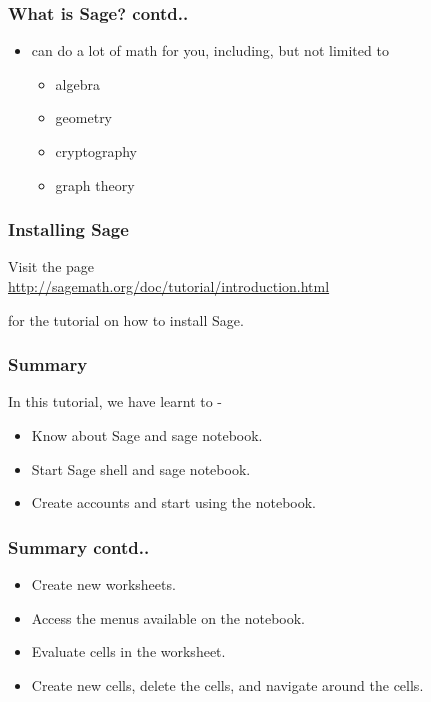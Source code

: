 \documentclass[17pt,compress]{beamer}
\begin{document}
\begin{frame}
\frametitle{What is Sage? contd..}
\label{sec-3.2}

\begin{itemize}
\item can do a lot of math for you, including, but not limited to\pause
	\begin{itemize}
	\item algebra
	\item geometry
	\item cryptography
	\item graph theory
	\end{itemize}\pause
\end{itemize}
\end{frame}
\begin{frame}
\frametitle{Installing Sage}
\label{sec-4}

   Visit the page\\
\vspace{8pt}   
   \url{http://sagemath.org/doc/tutorial/introduction.html}\\\pause
\vspace{5pt}   
  
   for the tutorial on how to install Sage.
\end{frame}
\begin{frame}
\frametitle{Summary}
\label{sec-5.1}

 In this tutorial, we have learnt to - 

\begin{itemize}
\item Know about Sage and sage notebook.
\item Start Sage shell  and sage notebook.
\item Create accounts and start using the notebook.
\end{itemize}
\end{frame}
\begin{frame}
\frametitle{Summary contd..}
\label{sec-5.2}

\begin{itemize}
\item Create new worksheets.
\item Access the menus available on the notebook.
\item Evaluate cells in the worksheet.
\item Create new cells, delete the cells,
     and navigate around the cells.
\end{itemize}
\end{frame}
\end{document}
